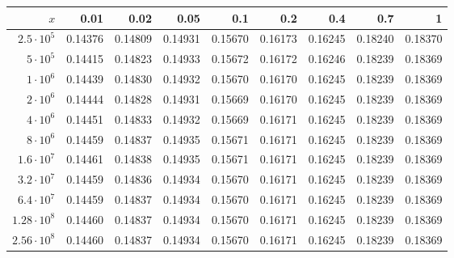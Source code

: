 \begin{tabular}{@{}rrrrrrrrr@{}}
\toprule
$x$ & 0.01 & 0.02 & 0.05 & 0.1 & 0.2 & 0.4 & 0.7 & 1 \\
\midrule
$2.5\cdot10^{5}$ & 0.14376 & 0.14809 & 0.14931 & 0.15670 & 0.16173 & 0.16245 & 0.18240 & 0.18370 \\
$5\cdot10^{5}$ & 0.14415 & 0.14823 & 0.14933 & 0.15672 & 0.16172 & 0.16246 & 0.18239 & 0.18369 \\
$1\cdot10^{6}$ & 0.14439 & 0.14830 & 0.14932 & 0.15670 & 0.16170 & 0.16245 & 0.18239 & 0.18369 \\
$2\cdot10^{6}$ & 0.14444 & 0.14828 & 0.14931 & 0.15669 & 0.16170 & 0.16245 & 0.18239 & 0.18369 \\
$4\cdot10^{6}$ & 0.14451 & 0.14833 & 0.14932 & 0.15669 & 0.16171 & 0.16245 & 0.18239 & 0.18369 \\
$8\cdot10^{6}$ & 0.14459 & 0.14837 & 0.14935 & 0.15671 & 0.16171 & 0.16245 & 0.18239 & 0.18369 \\
$1.6\cdot10^{7}$ & 0.14461 & 0.14838 & 0.14935 & 0.15671 & 0.16171 & 0.16245 & 0.18239 & 0.18369 \\
$3.2\cdot10^{7}$ & 0.14459 & 0.14836 & 0.14934 & 0.15670 & 0.16171 & 0.16245 & 0.18239 & 0.18369 \\
$6.4\cdot10^{7}$ & 0.14459 & 0.14837 & 0.14934 & 0.15670 & 0.16171 & 0.16245 & 0.18239 & 0.18369 \\
$1.28\cdot10^{8}$ & 0.14460 & 0.14837 & 0.14934 & 0.15670 & 0.16171 & 0.16245 & 0.18239 & 0.18369 \\
$2.56\cdot10^{8}$ & 0.14460 & 0.14837 & 0.14934 & 0.15670 & 0.16171 & 0.16245 & 0.18239 & 0.18369 \\
\bottomrule
\end{tabular}
